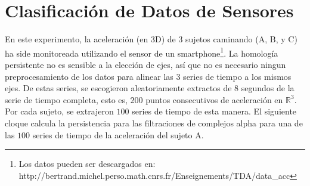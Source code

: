 \section{Clasificaci\'on de Datos de Sensores}
En este experimento, la aceleraci\'on (en $3$D) de $3$ sujetos caminando
(A, B, y C) ha side monitoreada utilizando el sensor de un
smartphone\footnote{Los datos pueden ser descargados en:
http://bertrand.michel.perso.math.cnrs.fr/Enseignements/TDA/data\_acc}.
La homolog\'ia persistente no es sensible a la elecci\'on de ejes,
así que no es necesario ningun preprocesamiento de los datos para alinear
las $3$ series de tiempo a los mismos ejes.
De estas series, se escogieron aleatoriamente extractos de
$8$ segundos de la serie de tiempo completa, esto es,
$200$ puntos consecutivos de aceleraci\'on en $\mathbb{R}^{3}$.
Por cada sujeto, se extrajeron $100$ series de tiempo de esta manera.
El siguiente cloque calcula la persistencia para las filtraciones de complejos alpha para
una de las $100$ series de tiempo de la aceleraci\'on del sujeto A.